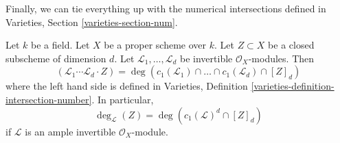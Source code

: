 \noindent
Finally, we can tie everything up with the numerical intersections
defined in Varieties, Section \ref{varieties-section-num}.

\begin{lemma}
\label{lemma-degrees-and-numerical-intersections}
Let $k$ be a field. Let $X$ be a proper scheme over $k$.
Let $Z \subset X$ be a closed subscheme of dimension $d$.
Let $\mathcal{L}_1, \ldots, \mathcal{L}_d$ be invertible
$\mathcal{O}_X$-modules. Then
$$
(\mathcal{L}_1 \cdots \mathcal{L}_d \cdot Z) =
\deg(
c_1(\mathcal{L}_1) \cap \ldots \cap c_1(\mathcal{L}_d) \cap [Z]_d)
$$
where the left hand side is defined in
Varieties, Definition \ref{varieties-definition-intersection-number}.
In particular,
$$
\deg_\mathcal{L}(Z) = \deg(c_1(\mathcal{L})^d \cap [Z]_d)
$$
if $\mathcal{L}$ is an ample invertible $\mathcal{O}_X$-module.
\end{lemma}

